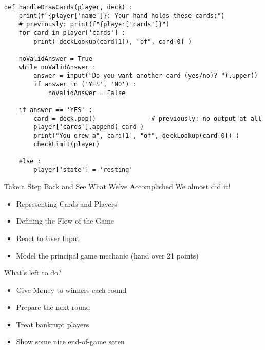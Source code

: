 \begin{frame}[fragile]
%
\begin{codebox}
\begin{verbatim}
def handleDrawCards(player, deck) :
    print(f"{player['name']}: Your hand holds these cards:")
    # previously: print(f"{player['cards']}")
    for card in player['cards'] :
        print( deckLookup(card[1]), "of", card[0] )
    
    noValidAnswer = True
    while noValidAnswer :
        answer = input("Do you want another card (yes/no)? ").upper()
        if answer in ('YES', 'NO') :
            noValidAnswer = False
    
    if answer == 'YES' :
        card = deck.pop()               # previously: no output at all
        player['cards'].append( card )
        print("You drew a", card[1], "of", deckLookup(card[0]) )
        checkLimit(player)
        
    else :
        player['state'] = 'resting'
\end{verbatim}
\end{codebox}
%
\end{frame}


\begin{frame}{Take a Step Back and See What We've Accomplished}
%
We almost did it!
\begin{itemize}
\item Representing Cards and Players
\item Defining the Flow of the Game
\item React to User Input
\item Model the principal game mechanic (hand over 21 points)
\end{itemize}

What's left to do?
\begin{itemize}
\item Give Money to winners each round
\item Prepare the next round
\item Treat bankrupt players
\item Show some nice end-of-game scren
\end{itemize}
%
\end{frame}


